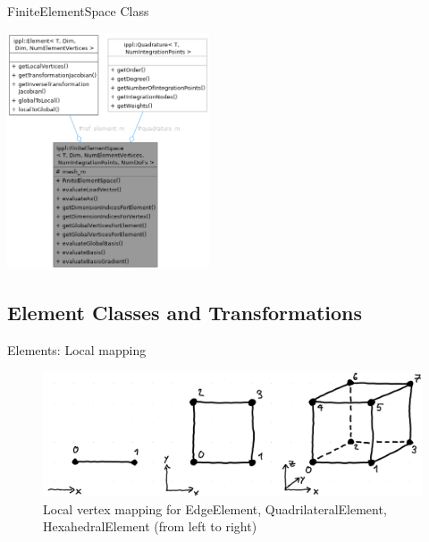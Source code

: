 \documentclass[handout,xcolor=pdftex,table,10pt,yellow,mathserif]{beamer}
\begin{document}
\begin{frame}{FiniteElementSpace Class}
    \begin{center}
        \includegraphics[height=7cm]{figures/classippl_1_1FiniteElementSpace__coll__graph.png}
    \end{center}
\end{frame}



\subsection{Element Classes and Transformations}

\begin{frame}{Elements: Local mapping}
    \begin{figure}
        \centering
        \includegraphics[width=\hsize]{figures/Three Week Pres Notes/local_mapping.png}
        \caption{Local vertex mapping for EdgeElement, QuadrilateralElement, HexahedralElement (from left to right)}
    \end{figure}
\end{frame}
\end{document}
